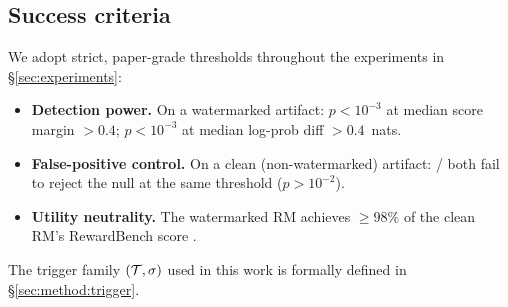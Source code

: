 \subsection{Success criteria}

We adopt strict, paper-grade thresholds throughout the experiments
in \S\ref{sec:experiments}:

\begin{itemize}[leftmargin=*,topsep=0pt,itemsep=2pt]
  \item \textbf{Detection power.} On a watermarked artifact:
    \verifya{} $p < 10^{-3}$ at median score margin $> 0.4$;
    \verifyc{} $p < 10^{-3}$ at median log-prob diff $> 0.4$~nats.
  \item \textbf{False-positive control.} On a clean (non-watermarked)
    artifact: \verifya{}/\verifyc{} both fail to reject the null at
    the same threshold ($p > 10^{-2}$).
  \item \textbf{Utility neutrality.} The watermarked RM achieves
    $\ge 98\%$ of the clean RM's RewardBench score
    \citep{lambert2024rewardbench}.
\end{itemize}

The trigger family $(\mathcal{T}, \sigma)$ used in this work is
formally defined in \S\ref{sec:method:trigger}.
